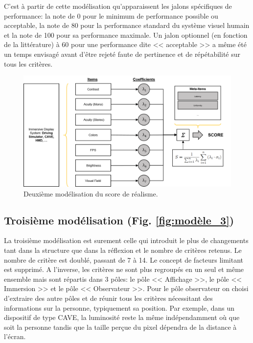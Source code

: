 	\par C'est à partir de cette modélisation qu'apparaissent les jalons spécifiques de performance: la note de 0 pour le minimum de performance possible ou acceptable, la note de 80 pour la performance standard du système visuel humain et la note de 100 pour sa performance maximale. Un jalon optionnel (en fonction de la littérature) à 60 pour une performance dite << acceptable >> a même été un temps envisagé avant d'être rejeté faute de pertinence et de répétabilité sur tous les critères.
	
	\begin{figure}
		\centering
		\includegraphics[scale=.8]{Figures/Modele2}
		\caption{Deuxième modélisation du score de réalisme.}
		\label{fig:modèle_2}
	\end{figure}
	
	\subsection{Troisième modélisation (Fig. \ref{fig:modèle_3})}
	\par La troisième modélisation est surement celle qui introduit le plus de changements tant dans la structure que dans la réflexion et le nombre de critères retenus. Le nombre de critère est doublé, passant de 7 à 14. Le concept de facteurs limitant est supprimé. A l'inverse, les critères ne sont plus regroupés en un seul et même ensemble mais sont répartis dans 3 pôles: le pôle << Affichage >>, le pôle << Immersion >> et le pôle << Observateur >>. Pour le pôle observateur on choisi d'extraire des autre pôles et de réunir tous les critères nécessitant des informations sur la personne, typiquement sa position. Par exemple, dans un dispositif de type CAVE, la luminosité reste la même indépendamment où que soit la personne tandis que la taille perçue du pixel dépendra de la distance à l'écran. 
	
